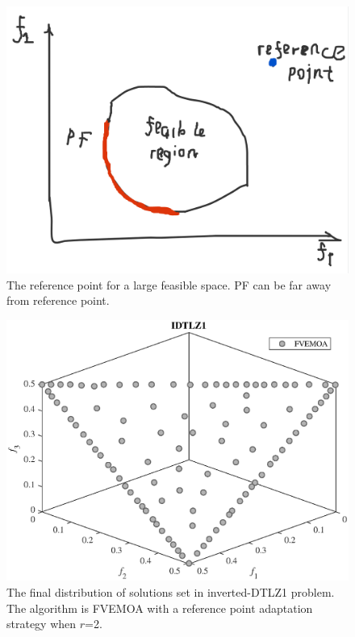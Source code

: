 \documentclass[conference]{IEEEtran}
\begin{document}
\begin{figure}[!t]
  \centering
  \includegraphics[width=\columnwidth]{test}
  \caption{The reference point for a large feasible space.
   PF can be far away from reference point.}
  \label{rpa1}
\end{figure}
\begin{figure}[!t]
  \centering
  \includegraphics[width=\columnwidth]{FVEMOA_IDTLZ1}
  \caption{The final distribution of solutions set in inverted-DTLZ1 problem.
   The algorithm is FVEMOA with a reference point adaptation strategy when $r$=2.}
  \label{rpa2}
\end{figure}
\end{document}
